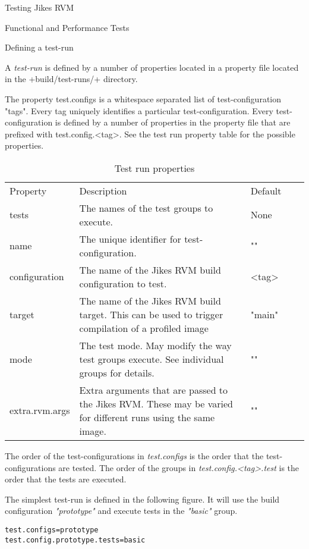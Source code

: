 \begin{chapter}{Testing Jikes RVM}
\begin{section}{Functional and Performance Tests}
\begin{subsection}{Defining a test-run}

A \textit{test-run} is defined by a number of properties located in a property file located in the \spverb+build/test-runs/+ directory.

The property test.configs is a whitespace separated list of test-configuration "tags". Every tag uniquely identifies a particular test-configuration. Every test-configuration is defined by a number of properties in the property file that are prefixed with test.config.\textless tag\textgreater . See the test run property table for the possible properties.

\begin{table}[h]
\centering
\begin{tabular}{p{0.2\linewidth}p{0.6\linewidth}p{0.2\linewidth}}
Property & Description & Default \\
tests & The names of the test groups to execute. & None \\
name & The unique identifier for test-configuration. & "" \\
configuration & The name of the Jikes RVM build configuration to test. & \textless tag\textgreater  \\
target & The name of the Jikes RVM build target. This can be used to trigger compilation of a profiled image & "main" \\
mode & The test mode. May modify the way test groups execute. See individual groups for details. & "" \\
extra.rvm.args & Extra arguments that are passed to the Jikes RVM. These may be varied for different runs using the same image. & "" \\
\end{tabular}
\caption{Test run properties}
\end{table}

The order of the test-configurations in \textit{test.configs} is the order that the test-configurations are tested. The order of the groups in \textit{test.config.\textless tag\textgreater .test} is the order that the tests are executed.

The simplest test-run is defined in the following figure. It will use the build configuration \textit{"prototype"} and execute tests in the \textit{"basic"} group.

\begin{lstlisting}[title=build/test-runs/simple.properties]
test.configs=prototype
test.config.prototype.tests=basic
\end{lstlisting}


\end{subsection}
\end{section}
\end{chapter}
